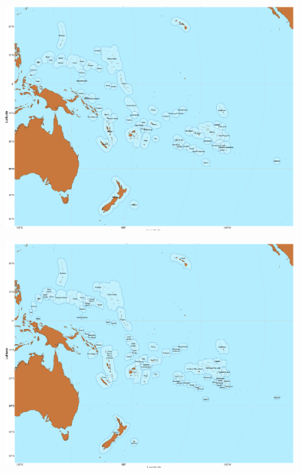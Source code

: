 \documentclass[12pt,letterpaper]{article}
\begin{document}
\begin{figure}
\centering
\includegraphics[width=\textwidth]{SBZR_buffer.png}
\caption{{}}
\label{appendix_SBZR_buffer}
\end{figure}


\begin{figure}
\centering
\includegraphics[width=\textwidth]{SBZR_cost.png}
\caption{{}}
\label{appendix_SBZR_cost}
\end{figure}
\end{document}
